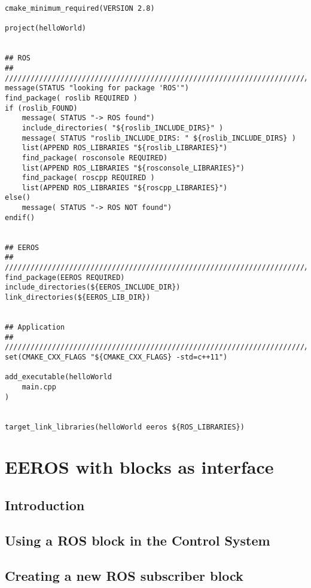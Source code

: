 \lstset{language=c}
\begin{lstlisting}
cmake_minimum_required(VERSION 2.8)
 
project(helloWorld)


## ROS
## ////////////////////////////////////////////////////////////////////////
message(STATUS "looking for package 'ROS'")
find_package( roslib REQUIRED )
if (roslib_FOUND)
	message( STATUS "-> ROS found")
	include_directories( "${roslib_INCLUDE_DIRS}" )
	message( STATUS "roslib_INCLUDE_DIRS: " ${roslib_INCLUDE_DIRS} )
	list(APPEND ROS_LIBRARIES "${roslib_LIBRARIES}")
	find_package( rosconsole REQUIRED)
	list(APPEND ROS_LIBRARIES "${rosconsole_LIBRARIES}")
	find_package( roscpp REQUIRED )
	list(APPEND ROS_LIBRARIES "${roscpp_LIBRARIES}")
else()
	message( STATUS "-> ROS NOT found")
endif()


## EEROS
## ////////////////////////////////////////////////////////////////////////
find_package(EEROS REQUIRED)
include_directories(${EEROS_INCLUDE_DIR})
link_directories(${EEROS_LIB_DIR})


## Application
## ////////////////////////////////////////////////////////////////////////
set(CMAKE_CXX_FLAGS "${CMAKE_CXX_FLAGS} -std=c++11")
 
add_executable(helloWorld
	main.cpp	
)


target_link_libraries(helloWorld eeros ${ROS_LIBRARIES})

\end{lstlisting}


\section{EEROS with blocks as interface}
\subsection{Introduction}

\subsection{Using a ROS block in the Control System}

\subsection{Creating a new ROS subscriber block}

